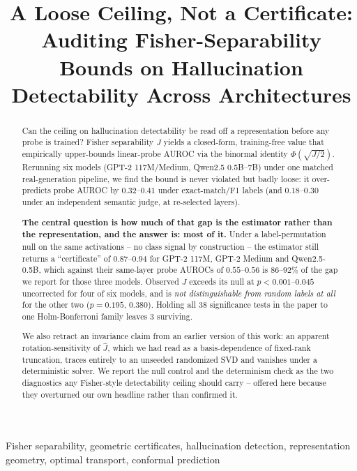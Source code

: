 \documentclass[onecolumn]{jmlr}
\title[A Loose Ceiling, Not a Certificate]{A Loose Ceiling, Not a Certificate: Auditing Fisher-Separability
Bounds on Hallucination Detectability Across Architectures}
\author{\Name{Lakshmi Chakradhar Vijayarao} \Email{lakshmichakradhar.v@gmail.com}}
\begin{document}
\maketitle

\begin{abstract}
Can the ceiling on hallucination detectability be read off a representation
before any probe is trained? Fisher separability $J$ yields a closed-form,
training-free value that empirically upper-bounds linear-probe AUROC via the
binormal identity $\Phi(\sqrt{J/2})$. Rerunning six models (GPT-2
117M/Medium, Qwen2.5 0.5B--7B) under one matched real-generation pipeline, we
find the bound is never violated but badly loose: it over-predicts probe AUROC
by $0.32$--$0.41$ under exact-match/F1 labels (and $0.18$--$0.30$ under an
independent semantic judge, at re-selected layers).

\textbf{The central question is how much of that gap is the estimator rather
than the representation, and the answer is: most of it.} Under a
label-permutation null on the same activations -- no class signal by
construction -- the estimator still returns a ``certificate'' of
$0.87$--$0.94$ for GPT-2 117M, GPT-2 Medium and Qwen2.5-0.5B, which against
their same-layer probe AUROCs of $0.55$--$0.56$ is $86$--$92\%$
of the gap we report for those three models. Observed $J$ exceeds its null at $p<0.001$--$0.045$
uncorrected for four of six models, and is \emph{not distinguishable from
random labels at all} for the other two ($p=0.195$, $0.380$). Holding all 38 significance tests in the paper to one
Holm-Bonferroni family leaves $3$ surviving.

We also retract an invariance claim from an earlier version of this work: an
apparent rotation-sensitivity of $\hat J$, which we had read as a
basis-dependence of fixed-rank truncation, traces entirely to an unseeded
randomized SVD and vanishes under a deterministic solver. We report the
null control and the determinism check as the two diagnostics any
Fisher-style detectability ceiling should carry -- offered here because they
overturned our own headline rather than confirmed it.
\end{abstract}

\begin{keywords}
Fisher separability, geometric certificates, hallucination detection, representation geometry, optimal transport, conformal prediction
\end{keywords}
\end{document}
